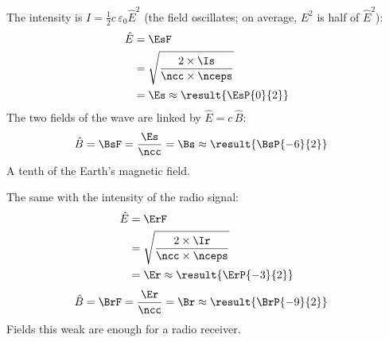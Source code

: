 \begin{abcliste}
\abc The intensity is $I = \frac{1}{2}c\,\varepsilon_0\hat E^2$ (the field oscillates; on average, $E^2$ is half of $\hat E^2$):
\begin{align}
 \hat E &= \EsF \\
   &= \sqrt{\frac{2\times\Is}{\ncc\times\nceps}} \\
   &= \Es \approx \result{\EsP{0}{2}}
\end{align}
The two fields of the wave are linked by $\hat E = c\,\hat B$:
\begin{align}
 \hat B &= \BsF = \frac{\Es}{\ncc} = \Bs \approx \result{\BsP{-6}{2}}
\end{align}
A tenth of the Earth's magnetic field.

\abc The same with the intensity of the radio signal:
\begin{align}
 \hat E &= \ErF \\
   &= \sqrt{\frac{2\times\Ir}{\ncc\times\nceps}} \\
   &= \Er \approx \result{\ErP{-3}{2}}
\end{align}
\begin{align}
 \hat B &= \BrF = \frac{\Er}{\ncc} = \Br \approx \result{\BrP{-9}{2}}
\end{align}
Fields this weak are enough for a radio receiver.
\end{abcliste}
